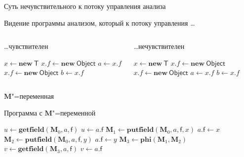 \documentclass[usenames,dvipsnames,pdftex,unicode,hidelinks]{beamer}
\newcommand{\M}{\ensuremath{\mathbf{M}}}
\newcommand{\type}[1]{\mathsf{#1}}
\newcommand{\field}[1]{\mathsf{#1}}
\newcommand{\op}[1]{\mathbf{#1}}
\begin{document}
\begin{frame}{Суть нечувствительного к потоку управления анализа}

  \centerline{Видение программы анализом, который к потоку управления \ldots}

  \begin{columns}[t]
    \begin{column}{0.5\textwidth}
      \begin{block}{\ldots чувствителен}
        \begin{algorithmic}[1]
          \State $x \gets \op{new}~\type{T}$
          \State $x.f \gets \op{new}~\type{Object}$
          \State $a \gets x.f$
          \State $x.f \gets \op{new}~\type{Object}$
          \State $b \gets x.f$
        \end{algorithmic}
      \end{block}
    \end{column}
    \begin{column}{0.5\textwidth}
      \begin{block}{\ldots нечувствителен}
        \begin{algorithmic}
          \State $x \gets \op{new}~\type{T}$
          \State $x.f \gets \op{new}~\type{Object}$
          \State $x.f \gets \op{new}~\type{Object}$
          \State $a \gets x.f$
          \State $b \gets x.f$
        \end{algorithmic}
      \end{block}
    \end{column}
  \end{columns}

\end{frame}

\begin{frame}{\M"=переменная}

  \begin{block}{Программа с \M"=переменной}
    \begin{algorithmic}[1]
      \State $u \gets \op{getfield}(\M_0, a, \field{f})$
        \Comment $u \gets a.\field{f}$
      \If{\ldots}
        \State $\M_1 \gets \op{putfield}(\M_0, a, \field{f}, x)$
          \Comment $a.\field{f} \gets x$
      \Else
        \State $\M_2 \gets \op{putfield}(\M_0, a, \field{f}, y)$
          \Comment $a.\field{f} \gets y$
      \EndIf
      \State $\M_3 \gets \op{phi}(\M_1, \M_2)$
      \State $v \gets \op{getfield}(\M_3, a, \field{f})$
        \Comment $v \gets a.\field{f}$
    \end{algorithmic}
  \end{block}

\end{frame}
\end{document}
